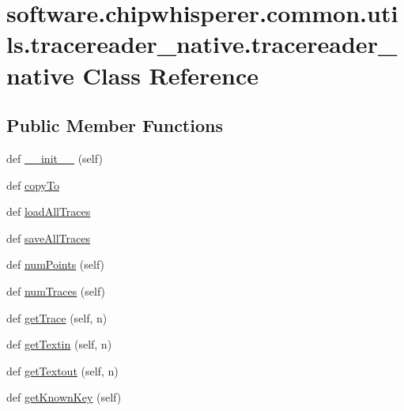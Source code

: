 \hypertarget{classsoftware_1_1chipwhisperer_1_1common_1_1utils_1_1tracereader__native_1_1tracereader__native}{}\section{software.\+chipwhisperer.\+common.\+utils.\+tracereader\+\_\+native.\+tracereader\+\_\+native Class Reference}
\label{classsoftware_1_1chipwhisperer_1_1common_1_1utils_1_1tracereader__native_1_1tracereader__native}
\subsection*{Public Member Functions}
\begin{DoxyCompactItemize}
\item 
def \hyperlink{classsoftware_1_1chipwhisperer_1_1common_1_1utils_1_1tracereader__native_1_1tracereader__native_a635715692afd4066fb203fa26d9381e1}{\+\_\+\+\_\+init\+\_\+\+\_\+} (self)
\item 
def \hyperlink{classsoftware_1_1chipwhisperer_1_1common_1_1utils_1_1tracereader__native_1_1tracereader__native_ab55179fe2820d22623ee8e5aed928a85}{copy\+To}
\item 
def \hyperlink{classsoftware_1_1chipwhisperer_1_1common_1_1utils_1_1tracereader__native_1_1tracereader__native_a829e10934ef3611c8e3edf870c0f8ab9}{load\+All\+Traces}
\item 
def \hyperlink{classsoftware_1_1chipwhisperer_1_1common_1_1utils_1_1tracereader__native_1_1tracereader__native_a9979deb7f38fb536b3b32eb1123d1f39}{save\+All\+Traces}
\item 
def \hyperlink{classsoftware_1_1chipwhisperer_1_1common_1_1utils_1_1tracereader__native_1_1tracereader__native_ac0bf49307a561631069f109f4a988ea9}{num\+Points} (self)
\item 
def \hyperlink{classsoftware_1_1chipwhisperer_1_1common_1_1utils_1_1tracereader__native_1_1tracereader__native_af3d35a695bf766b950a6326372db6689}{num\+Traces} (self)
\item 
def \hyperlink{classsoftware_1_1chipwhisperer_1_1common_1_1utils_1_1tracereader__native_1_1tracereader__native_a0e7483f36a41c70bfadb11ada82c23c4}{get\+Trace} (self, n)
\item 
def \hyperlink{classsoftware_1_1chipwhisperer_1_1common_1_1utils_1_1tracereader__native_1_1tracereader__native_afd0196a08bfed7a6a4ffc6a0b768b41d}{get\+Textin} (self, n)
\item 
def \hyperlink{classsoftware_1_1chipwhisperer_1_1common_1_1utils_1_1tracereader__native_1_1tracereader__native_a4a15ce3e8e24c7d3b1d51fdf537db2e3}{get\+Textout} (self, n)
\item 
def \hyperlink{classsoftware_1_1chipwhisperer_1_1common_1_1utils_1_1tracereader__native_1_1tracereader__native_a1df18a8493086e98bae7d2001032ee23}{get\+Known\+Key} (self)
\end{DoxyCompactItemize}
